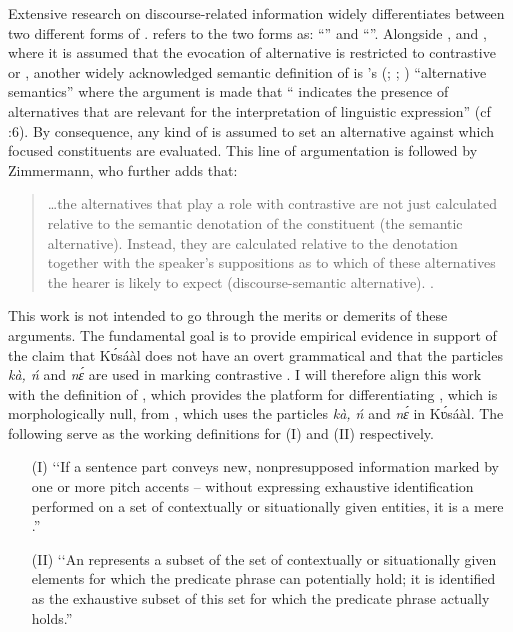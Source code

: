 \documentclass[output=paper
,newtxmath
,modfonts
,nonflat]{langsci/langscibook}
\begin{document}
Extensive research on discourse-related information widely differentiates between two different forms of  \citep{Halliday1967, chafe1976,szabolcsi1981,michael1986,ÉKiss1998,Vallduví1998,Molnár2002}. \citet{ÉKiss1998} refers to the two forms as: “” and  “”. Alongside \citet{ÉKiss1998}, \citet{Vallduví1998} and \citet{selkirk2008}, where it is assumed that the evocation of alternative is restricted to contrastive or , another widely acknowledged semantic definition of  is \citeauthor{rooth1985}’s (\citeyear{rooth1985}; \citeyear{Rooth1992}; \citeyear{rooth1996}) “alternative semantics” where the argument is made that “ indicates the presence of alternatives that are relevant for the interpretation of linguistic expression” (cf \citealt{krifka2007}:6).  By consequence, any kind of  is assumed to set an alternative against which focused constituents are evaluated. This line of argumentation is followed by Zimmermann, who further adds that: 

\begin{quote}
…the alternatives that play a role with contrastive  are not just calculated relative to the semantic denotation of the  constituent (the semantic alternative). Instead, they are calculated relative to the  denotation together with the speaker’s suppositions as to which of these alternatives the hearer is likely to expect (discourse-semantic alternative). \citep[3]{Zimmermann2008}. 
\end{quote}

This work is not intended to go through the merits or demerits of these arguments. The fundamental goal is to provide empirical evidence in support of the claim that Kʋ́sáàl does not have an overt grammatical  and that the particles \textit{kà, ń} and \textit{nɛ́} are used in marking contrastive . I will therefore align this work with the definition of \citet{ÉKiss1998}, which provides the platform for differentiating , which is morphologically null, from , which uses the particles \textit{kà, ń} and \textit{nɛ́} in Kʋ́sáàl. The following serve as the working definitions for (I)  and (II)  respectively. 

\begin{enumerate}
	\item[(I)]  ‘‘If a sentence part conveys new, nonpresupposed information marked by one or more pitch accents – without expressing exhaustive identification performed on a set of contextually or situationally given entities, it is a mere .”  \citep[246]{ÉKiss1998}
 

 
	\item[(II)]  ‘‘An  represents a subset of the set of contextually or situationally given elements for which the predicate phrase can potentially hold; it is identified as the exhaustive subset of this set for which the predicate phrase actually holds.” \citep[249]{ÉKiss1998}
\end{enumerate}  
\end{document}
